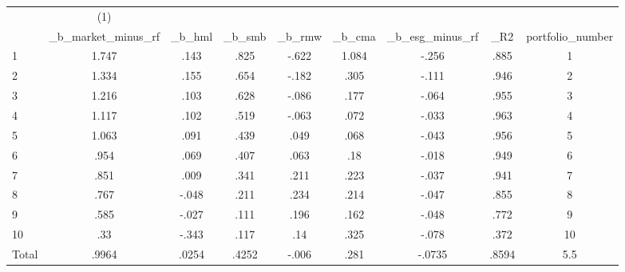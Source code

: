 {
\def\sym#1{\ifmmode^{#1}\else\(^{#1}\)\fi}
\begin{tabular}{l*{1}{cccccccc}}
\hline\hline
            &\multicolumn{1}{c}{(1)}&            &            &            &            &            &            &            \\
            &\_b\_market\_minus\_rf&      \_b\_hml&      \_b\_smb&      \_b\_rmw&      \_b\_cma&\_b\_esg\_minus\_rf&         \_R2&portfolio\_number\\
\hline
1           &       1.747&        .143&        .825&       -.622&       1.084&       -.256&        .885&           1\\
2           &       1.334&        .155&        .654&       -.182&        .305&       -.111&        .946&           2\\
3           &       1.216&        .103&        .628&       -.086&        .177&       -.064&        .955&           3\\
4           &       1.117&        .102&        .519&       -.063&        .072&       -.033&        .963&           4\\
5           &       1.063&        .091&        .439&        .049&        .068&       -.043&        .956&           5\\
6           &        .954&        .069&        .407&        .063&         .18&       -.018&        .949&           6\\
7           &        .851&        .009&        .341&        .211&        .223&       -.037&        .941&           7\\
8           &        .767&       -.048&        .211&        .234&        .214&       -.047&        .855&           8\\
9           &        .585&       -.027&        .111&        .196&        .162&       -.048&        .772&           9\\
10          &         .33&       -.343&        .117&         .14&        .325&       -.078&        .372&          10\\
Total       &       .9964&       .0254&       .4252&       -.006&        .281&      -.0735&       .8594&         5.5\\
\hline\hline
\end{tabular}
}
